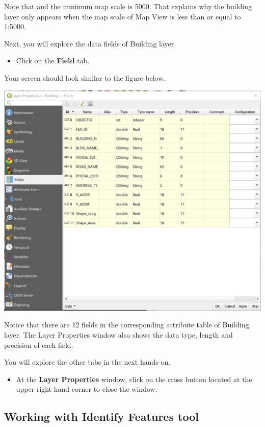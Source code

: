 \documentclass[
  letterpaper,
  DIV=11,
  numbers=noendperiod]{scrreprt}
\providecommand{\tightlist}{%
  \setlength{\itemsep}{0pt}\setlength{\parskip}{0pt}}\usepackage{longtable,booktabs,array}
\begin{document}
Note that and the minimum map scale is 5000. That explains why the
building layer only appears when the map scale of Map View is less than
or equal to 1:5000.

Next, you will explore the data fields of Building layer.

\begin{itemize}
\tightlist
\item
  Click on the \textbf{Field} tab.
\end{itemize}

Your screen should look similar to the figure below.

\includegraphics{./img/image1-20.jpg}

Notice that there are 12 fields in the corresponding attribute table of
Building layer. The Layer Properties window also shows the data type,
length and precision of each field.

You will explore the other tabs in the next hands-on.

\begin{itemize}
\tightlist
\item
  At the \textbf{Layer Properties} window, click on the cross button
  located at the upper right hand corner to close the window.
\end{itemize}

\hypertarget{working-with-identify-features-tool}{%
\subsection{Working with Identify Features
tool}\label{working-with-identify-features-tool}}
\end{document}
